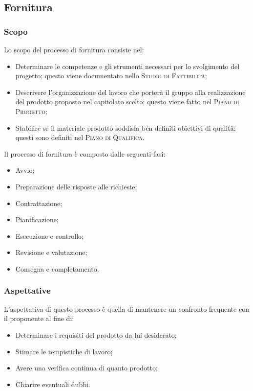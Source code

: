 \documentclass[../norme-di-progetto.tex]{subfiles}
\begin{document}

\subsection{Fornitura}
\subsubsection{Scopo}
Lo scopo del processo di fornitura consiste nel:
\begin{itemize}
  \item Determinare le competenze e gli strumenti necessari per lo svolgimento del progetto; questo viene documentato nello \textsc{Studio di Fattibilità};
  \item Descrivere l'organizzazione del lavoro che porterà il gruppo alla realizzazione del prodotto proposto nel capitolato scelto; questo viene fatto nel \textsc{Piano di Progetto};
  \item Stabilire se il materiale prodotto soddisfa ben definiti obiettivi di qualità; questi sono definiti nel \textsc{Piano di Qualifica}.
\end{itemize}
Il processo di fornitura è composto dalle seguenti fasi:
\begin{itemize}
  \item Avvio;
  \item Preparazione delle risposte alle richieste;
  \item Contrattazione;
  \item Pianificazione;
  \item Esecuzione e controllo;
  \item Revisione e valutazione;
  \item Consegna e completamento.
\end{itemize}

\subsubsection{Aspettative}
L'aspettativa di questo processo è quella di mantenere un confronto frequente con il proponente al fine di:
\begin{itemize}
  \item Determinare i requisiti del prodotto da lui desiderato;
  \item Stimare le tempistiche di lavoro;
  \item Avere una verifica continua di quanto prodotto;
  \item Chiarire eventuali dubbi.
\end{itemize}
\end{document}
